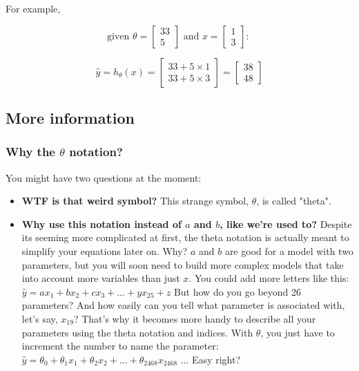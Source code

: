 For example,

$$
\text{given } \theta = \begin{bmatrix}33 \\ 5 \end{bmatrix} \text{ and } x = \begin{bmatrix}1 \\ 3 \end{bmatrix} \text{: }
$$

$$
\hat{y} = h_{\theta}(x) = \begin{bmatrix} 33 +  5 \times 1 \\ 33 + 5 \times 3\end{bmatrix}  = \begin{bmatrix} 38 \\ 48 \end{bmatrix} 
$$

\newpage

\subsection*{More information}

\subsubsection*{Why the $\theta$ notation?}

You might have two questions at the moment:
\begin{itemize}
    \item \textbf{WTF is that weird  symbol?}
    This strange symbol, $\theta$, is called "theta".
    
    \item \textbf{Why use this notation instead of $a$ and $b$, like we're used to?}
    Despite its seeming more complicated at first, the theta notation is actually meant to simplify your equations later on. Why?
    $a$ and $b$ are good for a model with two parameters, but you will soon need to build more complex models that take into account more variables than just $x$.
    You could add more letters like this:  $\hat{y} = ax_1 + bx_2 + cx_3 + ... + yx_{25} + z$  
    But how do you go beyond 26 parameters? And how easily can you tell what parameter is associated with, let's say, $x_{19}$? That's why it becomes more handy to describe all your parameters using the theta notation and indices.
    With $\theta$, you just have to increment the number to name the parameter:
    $\hat{y} = \theta_0 + \theta_1 x_1 + \theta_2 x_2 + ... + \theta_{2468} x_{2468}$ ... Easy right?
\end{itemize}


